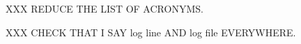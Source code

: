 \documentclass[a4paper,12pt,draft]{article}
\begin{document}
XXX REDUCE THE LIST OF ACRONYMS\@.

XXX CHECK THAT I SAY log line AND log file EVERYWHERE\@.

\newpage
\tableofcontents
\listoffigures
\listoftables

\newpage








\appendix


%


\label{bibliography}


\renewcommand{\glossarytitle}{\section{Glossary}\label{Glossary}}
\printglossary{}
\renewcommand{\glossarytitle}{\section{Acronyms}\label{Acronyms}}
\printacronym{}


\end{document}
